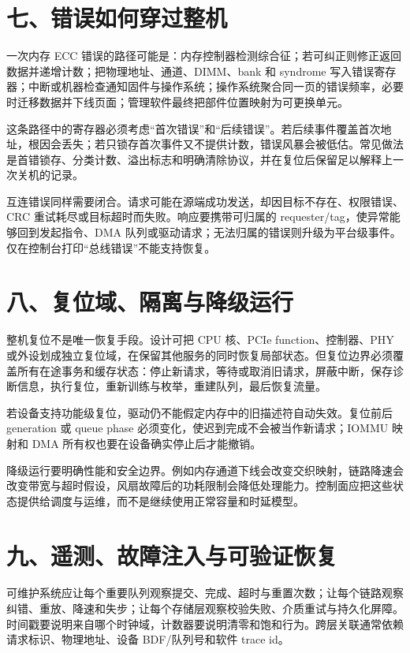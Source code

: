 \section{七、错误如何穿过整机}

一次内存 ECC 错误的路径可能是：内存控制器检测综合征；若可纠正则修正返回数据并递增计数；把物理地址、通道、DIMM、bank 和 syndrome 写入错误寄存器；中断或机器检查通知固件与操作系统；操作系统聚合同一页的错误频率，必要时迁移数据并下线页面；管理软件最终把部件位置映射为可更换单元。

这条路径中的寄存器必须考虑“首次错误”和“后续错误”。若后续事件覆盖首次地址，根因会丢失；若只锁存首次事件又不提供计数，错误风暴会被低估。常见做法是首错锁存、分类计数、溢出标志和明确清除协议，并在复位后保留足以解释上一次关机的记录。

互连错误同样需要闭合。请求可能在源端成功发送，却因目标不存在、权限错误、CRC 重试耗尽或目标超时而失败。响应要携带可归属的 requester/tag，使异常能够回到发起指令、DMA 队列或驱动请求；无法归属的错误则升级为平台级事件。仅在控制台打印“总线错误”不能支持恢复。

\section{八、复位域、隔离与降级运行}

整机复位不是唯一恢复手段。设计可把 CPU 核、PCIe function、控制器、PHY 或外设划成独立复位域，在保留其他服务的同时恢复局部状态。但复位边界必须覆盖所有在途事务和缓存状态：停止新请求，等待或取消旧请求，屏蔽中断，保存诊断信息，执行复位，重新训练与枚举，重建队列，最后恢复流量。

若设备支持功能级复位，驱动仍不能假定内存中的旧描述符自动失效。复位前后 generation 或 queue phase 必须变化，使迟到完成不会被当作新请求；IOMMU 映射和 DMA 所有权也要在设备确实停止后才能撤销。

降级运行要明确性能和安全边界。例如内存通道下线会改变交织映射，链路降速会改变带宽与超时假设，风扇故障后的功耗限制会降低处理能力。控制面应把这些状态提供给调度与运维，而不是继续使用正常容量和时延模型。

\section{九、遥测、故障注入与可验证恢复}

可维护系统应让每个重要队列观察提交、完成、超时与重置次数；让每个链路观察纠错、重放、降速和失步；让每个存储层观察校验失败、介质重试与持久化屏障。时间戳要说明来自哪个时钟域，计数器要说明清零和饱和行为。跨层关联通常依赖请求标识、物理地址、设备 BDF/队列号和软件 trace id。


